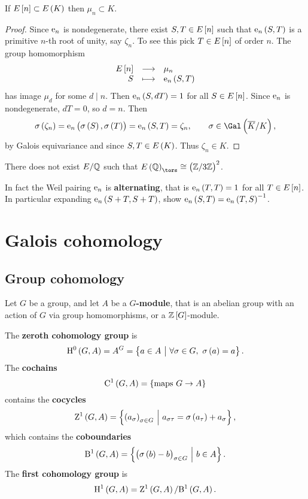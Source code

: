 \begin{corollary}
If $ E\sbr{n} \subset E\br{K} $ then $ \mu_n \subset K $.
\end{corollary}

\begin{proof}
Since $ \mathrm{e}_n $ is nondegenerate, there exist $ S, T \in E\sbr{n} $ such that $ \e_n\br{S, T} $ is a primitive $ n $-th root of unity, say $ \zeta_n $. To see this pick $ T \in E\sbr{n} $ of order $ n $. The group homomorphism
$$ \function{E\sbr{n}}{\mu_n}{S}{\e_n\br{S, T}} $$
has image $ \mu_d $ for some $ d \mid n $. Then $ \e_n\br{S, dT} = 1 $ for all $ S \in E\sbr{n} $. Since $ \mathrm{e}_n $ is nondegenerate, $ dT = 0 $, so $ d = n $. Then
$$ \sigma\br{\zeta_n} = \e_n\br{\sigma\br{S}, \sigma\br{T}} = \e_n\br{S, T} = \zeta_n, \qquad \sigma \in \Gal\br{\overline{K} / K}, $$
by Galois equivariance and since $ S, T \in E\br{K} $. Thus $ \zeta_n \in K $.
\end{proof}

\begin{example*}
There does not exist $ E / \mathbb{Q} $ such that $ E\br{\QQ}_{\tors} \cong \br{\ZZ / 3\ZZ}^2 $.
\end{example*}

\begin{remark*}
In fact the Weil pairing $ \mathrm{e}_n $ is \textbf{alternating}, that is $ \e_n\br{T, T} = 1 $ for all $ T \in E\sbr{n} $. In particular expanding $ \e_n\br{S + T, S + T} $, show $ \e_n\br{S, T} = \e_n\br{T, S}^{-1} $.
\end{remark*}

\pagebreak

\section{Galois cohomology}

\subsection{Group cohomology}


Let $ G $ be a group, and let $ A $ be a \textbf{$ G $-module}, that is an abelian group with an action of $ G $ via group homomorphisms, or a $ \ZZ\sbr{G} $-module.

\begin{definition*}
The \textbf{zeroth cohomology group} is
$$ \H^0\br{G, A} = A^G = \cbr{a \in A \st \forall \sigma \in G, \ \sigma\br{a} = a}. $$
The \textbf{cochains}
$$ \C^1\br{G, A} = \cbr{\text{maps} \ G \to A} $$
contains the \textbf{cocycles}
$$ \Z^1\br{G, A} = \cbr{\br{a_\sigma}_{\sigma \in G} \st a_{\sigma\tau} = \sigma\br{a_\tau} + a_\sigma}, $$
which contains the \textbf{coboundaries}
$$ \B^1\br{G, A} = \cbr{\br{\sigma\br{b} - b}_{\sigma \in G} \st b \in A}. $$
The \textbf{first cohomology group} is
$$ \H^1\br{G, A} = \Z^1\br{G, A} / \B^1\br{G, A}. $$
\end{definition*}

